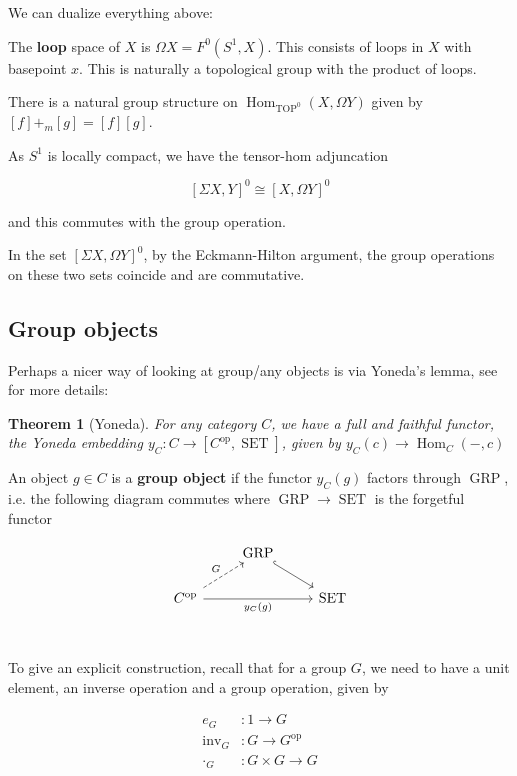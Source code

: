 \documentclass[12pt]{article}
\newtheorem{thm}{Theorem}[section]
\DeclareMathOperator{\Hom}{Hom}
\DeclareMathOperator{\op}{op}
\DeclareMathOperator{\SET}{SET}
\DeclareMathOperator{\TOP}{TOP}
\DeclareMathOperator{\GRP}{GRP}
\begin{document}
We can dualize everything above:

The \textbf{loop} space of $X$ is $\Omega X=F^0\left(S^1,X\right)$. This consists of loops in $X$ with basepoint $x$. This is naturally a topological group with the product of loops. 

There is a natural group structure on $\Hom_{\TOP^0}\left(X,\Omega Y\right)$ given by $[f]+_m[g]=[f][g]$.

As $S^1$ is locally compact, we have the tensor-hom adjuncation

\[\left[\Sigma X,Y\right]^0\cong\left[X,\Omega Y\right]^0\]

and this commutes with the group operation.

In the set $\left[\Sigma X,\Omega Y\right]^0$, by the Eckmann-Hilton argument, the group operations on these two sets coincide and are commutative.

\subsection{Group objects}

Perhaps a nicer way of looking at group/any objects is via Yoneda's lemma, see \cite{Waterhouse-Grp-schemes} for more details:

\begin{thm}[Yoneda]
    For any category $C$, we have a full and faithful functor, the Yoneda embedding $y_C:C\to\left[C^{\op},\SET\right]$, given by $y_C(c)\to\Hom_C\left(-,c\right)$
\end{thm}

An object $g\in C$ is a \textbf{group object} if the functor $y_C(g)$ factors through $\GRP$, i.e. the following diagram commutes where $\GRP\to\SET$ is the forgetful functor

\[\begin{tikzcd}
	& \GRP & \\
	{C^{\op}} && \SET \\
	\arrow[hook, from=1-2, to=2-3]
	\arrow["{y_C(g)}"', from=2-1, to=2-3]
	\arrow["G", dashed, from=2-1, to=1-2]
\end{tikzcd}\]

To give an explicit construction, recall that for a group $G$, we need to have a unit element, an inverse operation and a group operation, given by

\begin{align*}
    e_G&:1\to G\\
    \text{inv}_G&:G\to G^{\op}\\
    \cdot_G&:G\times G\to G
\end{align*}
\end{document}
